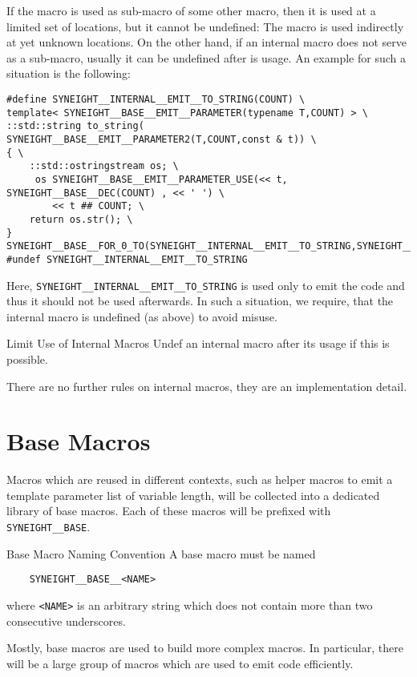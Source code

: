 If the macro is used as sub-macro of some other macro, then it is used
at a limited set of locations, but it cannot be undefined: The macro
is used indirectly at yet unknown locations. 
%
On the other hand, if an internal macro does not serve as a sub-macro,
usually it can be undefined after is usage. An example for such a
situation is the following: 
%
\begin{verbatim}
#define SYNEIGHT__INTERNAL__EMIT__TO_STRING(COUNT) \
template< SYNEIGHT__BASE__EMIT__PARAMETER(typename T,COUNT) > \
::std::string to_string( SYNEIGHT__BASE__EMIT__PARAMETER2(T,COUNT,const & t)) \
{ \
    ::std::ostringstream os; \
     os SYNEIGHT__BASE__EMIT__PARAMETER_USE(<< t, SYNEIGHT__BASE__DEC(COUNT) , << ' ') \
        << t ## COUNT; \
    return os.str(); \
}
SYNEIGHT__BASE__FOR_0_TO(SYNEIGHT__INTERNAL__EMIT__TO_STRING,SYNEIGHT__BASE__FOR_0_TO_MAX);
#undef SYNEIGHT__INTERNAL__EMIT__TO_STRING
\end{verbatim}
Here, {\tt SYNEIGHT\_\_INTERNAL\_\_EMIT\_\_TO\_STRING} is used only to
emit the code and thus it should not be used afterwards. In such a
situation, we require, that the internal macro is undefined (as above)
to avoid misuse.
%
\begin{guideline*}{Limit Use of Internal Macros}
  Undef an internal macro after its usage if this is possible.
\end{guideline*}
%
There are no further rules on internal macros, they are an
implementation detail.

\section{Base Macros}
\label{sec:base-macros}

Macros which are reused in different contexts, such as helper macros
to emit a template parameter list of variable length, will be
collected into a dedicated library of base macros. Each of these
macros will be prefixed with {\tt SYNEIGHT\_\_BASE}.

\begin{rule*}{Base Macro Naming Convention}
  A base macro must be named 
  \begin{verbatim}
    SYNEIGHT__BASE__<NAME>
  \end{verbatim}
  where {\tt <NAME>} is an arbitrary string which does not contain
  more than two consecutive underscores.
\end{rule*}
%
Mostly, base macros are used to build more complex macros. In
particular, there will be a large group of macros which are used to
emit code efficiently. 


